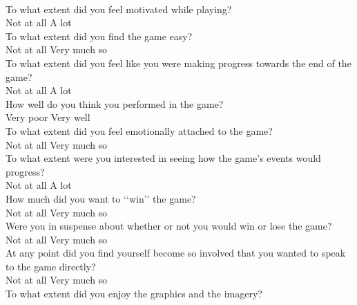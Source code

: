 \documentclass[../II2202-proposal.tex]{subfiles}
\begin{document}
\vspace{2mm} \\
To what extent did you feel motivated while playing?  \\
Not at all      \quad A lot
\vspace{2mm} \\
To what extent did you find the game easy? \\
Not at all      \quad Very much so
\vspace{2mm} \\
To what extent did you feel like you were making progress towards the end of the game? \\
Not at all      \quad A lot
\vspace{2mm} \\
How well do you think you performed in the game?  \\
Very poor      \quad Very well
\vspace{2mm} \\
To what extent did you feel emotionally attached to the game? \\
Not at all      \quad Very much so
\vspace{2mm} \\
To what extent were you interested in seeing how the game’s events would progress? \\
Not at all      \quad A lot
\vspace{2mm} \\
How much did you want to ‘‘win’’ the game? \\
Not at all      \quad Very much so
\vspace{2mm} \\
Were you in suspense about whether or not you would win or lose the game? \\
Not at all      \quad Very much so
\vspace{2mm} \\
At any point did you find yourself become so involved that you wanted to speak to the game directly? \\
Not at all      \quad Very much so
\vspace{2mm} \\
To what extent did you enjoy the graphics and the imagery?  \\
\end{document}
